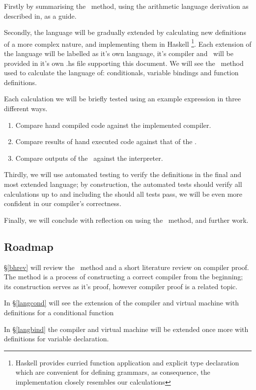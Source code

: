 \documentclass {article}
\begin{document}
Firstly by summarising the \BH\ method,
using the arithmetic language derivation 
as described in, as a guide.

Secondly, the language will be gradually extended
by calculating new definitions of a more complex nature,
and implementing them in Haskell
\footnote{Haskell provides curried function application
		and explicit type declaration which are
		convenient for defining grammars,
		as consequence, the implementation closely
		resembles our calculations}.
Each extension of the language will be labelled 
as it's own language, it's compiler and \vm\ 
will be provided in it's own .hs file supporting
this document.
We will see the \BH\ method used to calculate
the language of: conditionals, variable bindings
and function definitions.

Each calculation we will be briefly tested
using an example expression
in three different ways.

\begin{enumerate}
	\item Compare hand compiled code against the
		implemented compiler.
	\item Compare results of hand executed code 
		against that of the \vm.
	\item Compare outputs of the \vm\ against the interpreter.
\end{enumerate}

Thirdly, we will use automated testing
to verify the definitions in the final
and most extended language; 
by construction, the automated
tests should verify all calculations up
to and including the 
should all tests pass, we will
be even more confident in our 
compiler's correctness.

Finally, we will conclude with 
reflection on using the \BH\ method,
and further work.

\subsection{Roadmap}

\S\ref{bhrev} will review the \BH\ method 
and a short literature review on compiler
proof. The \BH method is
a process of constructing a correct 
compiler from the beginning; its construction
serves as it's proof,
however compiler proof is a related topic.

In \S\ref{langcond} will see the extension of the compiler and
virtual machine with definitions for a conditional function

In \S\ref{langbind} the compiler and
virtual machine will be extended
 once more with definitions for variable declaration.
 
\end{document}
